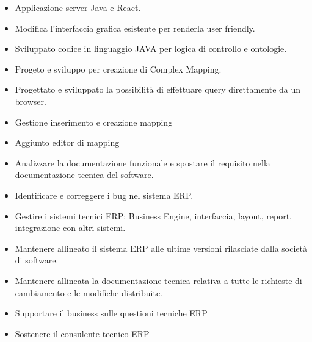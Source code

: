 \documentclass[10pt,a4paper]{altacv}
\begin{document}
\divider

\begin{itemize}
\item Applicazione server Java e React.
\item Modifica l’interfaccia grafica esistente per renderla user friendly.
\item Sviluppato codice in linguaggio JAVA per logica di controllo e ontologie.
\item Progeto e sviluppo per creazione di Complex Mapping.
\item Progettato e sviluppato la possibilità di effettuare query direttamente da un browser.
\item Gestione inserimento e creazione mapping
\item Aggiunto editor di mapping
\end{itemize}









\begin{itemize}
\item Analizzare la documentazione funzionale e spostare il requisito nella documentazione tecnica del software.
\item Identificare e correggere i bug nel sistema ERP.
\item Gestire i sistemi tecnici ERP: Business Engine, interfaccia, layout, report, integrazione con altri sistemi.
\item Mantenere allineato il sistema ERP alle ultime versioni rilasciate dalla società di software.
\item Mantenere allineata la documentazione tecnica relativa a tutte le richieste di cambiamento e le modifiche distribuite.
\item Supportare il business sulle questioni tecniche ERP
\item Sostenere il consulente tecnico ERP
\end{itemize}

\divider
\end{document}
